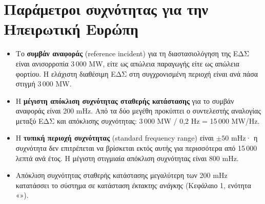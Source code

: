 \section{Παράμετροι συχνότητας για την Ηπειρωτική Ευρώπη}
\label{sec:ce-params}

\begin{itemize}
\item Το \textbf{συμβάν αναφοράς} (reference incident) για τη διαστασιολόγηση της ΕΔΣ είναι
      ανισορροπία 3\,000 MW, είτε ως απώλεια παραγωγής είτε ως απώλεια φορτίου. Η ελάχιστη
      διαθέσιμη ΕΔΣ στη συγχρονισμένη περιοχή είναι ανά πάσα στιγμή 3\,000 MW.
\item Η \textbf{μέγιστη απόκλιση συχνότητας σταθερής κατάστασης} για το συμβάν αναφοράς
      είναι 200 mHz. Από τα δύο μεγέθη προκύπτει ο συντελεστής αναλογίας μεταξύ ΕΔΣ και
      απόκλισης συχνότητας: 3\,000 MW / 0,2 Hz = 15\,000 MW/Hz.
\item Η \textbf{τυπική περιοχή συχνότητας} (standard frequency range) είναι $\pm 50$ mHz· η
      συχνότητα δεν επιτρέπεται να βρίσκεται εκτός αυτής για περισσότερα από
      15\,000 λεπτά ανά έτος. Η μέγιστη στιγμιαία απόκλιση συχνότητας είναι 800 mHz.
\item Απόκλιση συχνότητας σταθερής κατάστασης μεγαλύτερη των 200 mHz κατατάσσει το σύστημα
      σε κατάσταση \emph{έκτακτης ανάγκης} (Κεφάλαιο 1, ενότητα
      «»).
\end{itemize}

